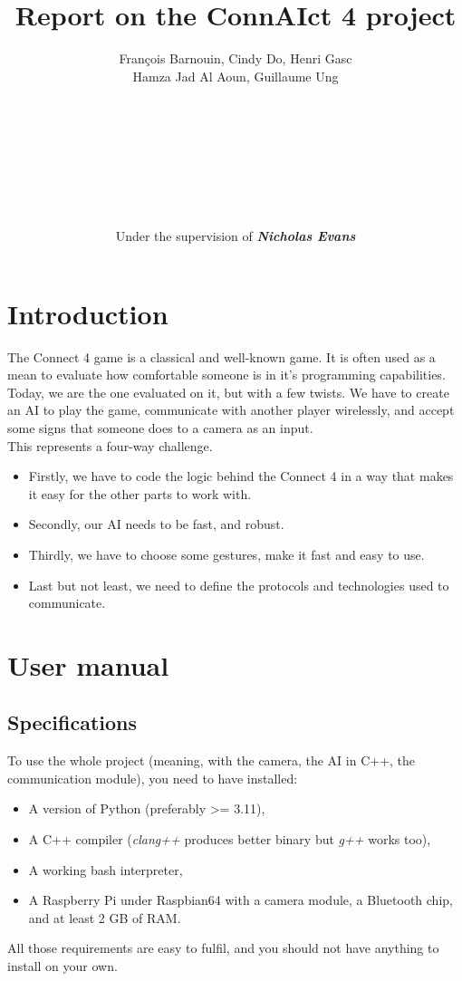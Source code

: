 \documentclass[11pt, a4paper, oneside]{report}
\title{\textbf{Report on the ConnAIct 4 project}}
\author{\normalsize François Barnouin, Cindy Do, Henri Gasc\\\normalsize Hamza Jad Al Aoun, Guillaume Ung\\\\\\\\\\\\\\\\\\Under the supervision of \textbf{\textit{Nicholas Evans}}}
\date{}
\begin{document}
	\marginsize{2.5cm}{2.5cm}{3cm}{3cm}
	\maketitle
	\tableofcontents

	\chapter{Introduction}
	The Connect 4 game is a classical and well-known game. It is often used as a mean to evaluate how comfortable someone is in it's programming capabilities. \\
	Today, we are the one evaluated on it, but with a few twists. We have to create an AI to play the game, communicate with another player wirelessly, and accept some signs that someone does to a camera as an input. \\
	This represents a four-way challenge.
	\begin{itemize}
		\item Firstly, we have to code the logic behind the Connect 4 in a way that makes it easy for the other parts to work with.
		\item Secondly, our AI needs to be fast, and robust.
		\item Thirdly, we have to choose some gestures, make it fast and easy to use.
		\item Last but not least, we need to define the protocols and technologies used to communicate.
	\end{itemize}

	\chapter{User manual}

	\section{Specifications}
	To use the whole project (meaning, with the camera, the AI in C++, the communication module), you need to have installed:
	\begin{itemize}
		\item A version of Python (preferably >= 3.11),
		\item A C++ compiler (\textit{clang++} produces better binary but \textit{g++} works too),
		\item A working bash interpreter,
		\item A Raspberry Pi under Raspbian64 with a camera module, a Bluetooth chip, and at least 2 GB of RAM.\@
	\end{itemize}
	All those requirements are easy to fulfil, and you should not have anything to install on your own. \\
\end{document}
